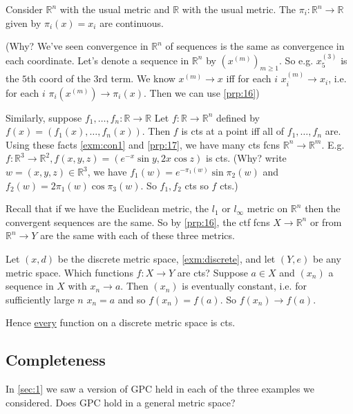 \begin{example}
    Consider $\mathbb{R}^n$ with the usual metric and $\mathbb{R}$ with the usual metric.
    The  $\pi_i: \mathbb{R}^n \to \mathbb{R}$ given by $\pi_i(x) = x_i$ are continuous. 
    
    (Why? We've seen convergence in $\mathbb{R}^n$ of sequences is the same as convergence in each coordinate. 
    Let's denote a sequence in $\mathbb{R}^n$ by $(x^{(m)})_{m \geq 1}$. So e.g. $x^{(3)}_5$ is the $5$th coord of the $3$rd term.
    We know $x^{(m)} \to x$ iff for each $i$ $x_i^{(m)} \to x_i$, i.e. for each $i$ $\pi_i(x^{(m)}) \to \pi_i(x)$.
    Then we can use \cref{prp:16})

    Similarly, suppose $f_1, \dots, f_n: \mathbb{R} \to \mathbb{R}$
    Let $f: \mathbb{R} \to \mathbb{R}^n$ defined by $f(x) = (f_1(x), \dots, f_n(x))$.
    Then $f$ is cts at a point iff all of $f_1, \dots, f_n$ are.
    Using these facts \cref{exm:con1} and \cref{prp:17}, we have many cts fcns $\mathbb{R}^n \to \mathbb{R}^m$.
    E.g. $f: \mathbb{R}^3 \to \mathbb{R}^2, f(x, y, z) = (e^{-x} \sin y, 2x \cos z)$ is cts. (Why? write $w = (x, y, z) \in \mathbb{R}^3$, we have $f_1(w) = e^{-\pi_1(w)} \sin \pi_2(w)$ and $f_2(w) = 2 \pi_1(w) \cos \pi_3(w)$.
    So $f_1, f_2$ cts so $f$ cts.)
\end{example} 

\begin{example}
    Recall that if we have the Euclidean metric, the $l_1$ or $l_\infty$ metric on $\mathbb{R}^n$ then the convergent sequences are the same.
    So by \cref{prp:16}, the ctf fcns $X \to \mathbb{R}^n$ or from $\mathbb{R}^n \to Y$ are the same with each of these three metrics.
\end{example} 

\begin{example}
    Let $(x, d)$ be the discrete metric space, \cref{exm:discrete}, and let $(Y, e)$ be any metric space.
    Which functions $f : X \to Y$ are cts?
    Suppose $a \in X$ and $(x_n)$ a sequence in $X$ with $x_n \to a$.
    Then $(x_n)$ is eventually constant, i.e. for sufficiently large $n$ $x_n = a$ and so $f(x_n) = f(a)$.
    So $f(x_n) \to f(a)$.

    Hence \underline{every} function on a discrete metric space is cts.
\end{example} 

\subsection{Completeness}
\begin{question}
    In \cref{sec:1} we saw a version of GPC held in each of the three examples we considered. 
    Does GPC hold in a general metric space?
\end{question} 

